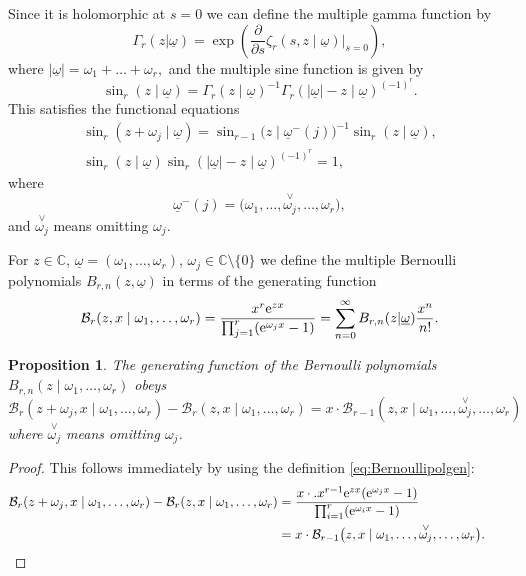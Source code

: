 \documentclass[pdftex]{sigma}
\numberwithin{equation}{section}
\newtheorem{Proposition}[Theorem]{Proposition}
 { \theoremstyle{definition}
\newtheorem{Definition}[Theorem]{Definition}
\newtheorem{Note}[Theorem]{Note}
\newtheorem{Example}[Theorem]{Example}
\newtheorem{Remark}[Theorem]{Remark} }
\begin{document}
Since it is holomorphic at $s=0$ we can define the multiple gamma function by
\begin{equation*}
\Gamma_r(z | \underline{\omega}) =\exp \left( \frac{\partial}{\partial s} \zeta_r(s,z \mid \underline{\omega})|_{s=0} \right),
\end{equation*}
where
$ |\underline{\omega}| = \omega_1 + \dots + \omega_r, $
and the multiple sine function is given by
\begin{equation*}
\sin_r(z\mid\underline{\omega}) = \Gamma_r(z\mid\underline{\omega})^{-1} \Gamma_r(|\underline{\omega}| - z \mid \underline{\omega})^{(-1)^r}.
\end{equation*}
This satisfies the functional equations
\begin{gather}
\sin_r(z+\omega_j \mid \underline{\omega}) =\sin_{r-1} \big(z \mid \underline{\omega}^{-}(j)\big)^{-1} \sin_r (z\mid\underline{\omega}),\nonumber \\
\sin_r(z\mid \underline{\omega}) \sin_r(|\underline{\omega}|-z \mid \underline{\omega})^{(-1)^r}=1,\label{eq:sinefunc}
\end{gather}
where \begin{equation*} \underline{\omega}^{-}(j)= \big(\omega_1, \dots,\overset{\vee}{\omega_j},\dots,\omega_r\big),\end{equation*}
and $\overset{\vee}{\omega_j}$ means omitting $\omega_j$.

For $z\in \mathbb{C}$, $\underline{\omega}=(\omega_1,\dots,\omega_r)$, $\omega_j \in \mathbb{C}\setminus\{0\}$ we define the multiple Bernoulli polynomials $B_{r,n}(z,\underline{\omega})$ in terms of the generating function
\begin{equation}\label{eq:Bernoullipolgen}
\mathcal{B}_r(z,x\mid \omega_1, \dots,\omega_r) = \frac{x^r {\rm e}^{z x}}{\prod_{j=1}^r ({\rm e}^{\omega_j x}-1)} = \sum_{n=0}^{\infty} B_{r,n}(z|\underline{\omega}) \frac{x^n}{n!}.
\end{equation}

\begin{Proposition}\label{prop:Bernoullidiff}
The generating function of the Bernoulli polynomials $B_{r,n}(z \mid \omega_1, \dots,\omega_r)$ obeys
\begin{equation*}
 \mathcal{B}_r(z+\omega_j,x\mid \omega_1, \dots,\omega_r)- \mathcal{B}_r(z,x\mid \omega_1, \dots,\omega_r) =x \cdot \mathcal{B}_{r-1}(z,x\mid \omega_1, \dots,\overset{\vee}{\omega_j},\dots,\omega_r)
\end{equation*}
where $\overset{\vee}{\omega_j}$ means omitting $\omega_j$.
\end{Proposition}
\begin{proof}
This follows immediately by using the definition \eqref{eq:Bernoullipolgen}:
\begin{align*}
 \mathcal{B}_r(z+\omega_j,x\mid \omega_1, \dots,\omega_r)- \mathcal{B}_r(z,x\mid \omega_1, \dots,\omega_r) &= \frac{x\cdot.x^{r-1} {\rm e}^{zx} ({\rm e}^{\omega_jx}-1)}{ \prod_{i=1}^r ({\rm e}^{\omega_i x}-1)} \\
 &=x \cdot \mathcal{B}_{r-1}\big(z,x\mid \omega_1, \dots,\overset{\vee}{\omega_j},\dots,\omega_r\big).\tag*{\qed}
\end{align*}\renewcommand{\qed}{}
\end{proof}
\end{document}
